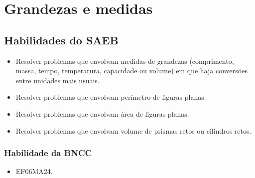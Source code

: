 
\chapter{Grandezas e medidas}

\section*{Habilidades do SAEB}

\begin{itemize}
\item
  Resolver problemas que envolvam medidas de grandezas (comprimento,
  massa, tempo, temperatura, capacidade ou volume) em que haja
  conversões entre unidades mais usuais.
\item
  Resolver problemas que envolvam perímetro de figuras planas.
\item
  Resolver problemas que envolvam área de figuras planas.
\item
  Resolver problemas que envolvam volume de prismas retos ou cilindros
  retos.
\end{itemize}

\subsection{Habilidade da BNCC} 

\begin{itemize}
\item EF06MA24.
\end{itemize}

